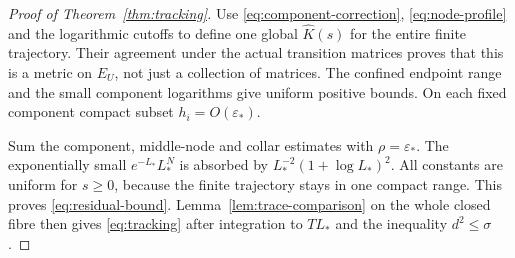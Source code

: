 \begin{proof}[Proof of Theorem~\ref{thm:tracking}]
Use \eqref{eq:component-correction},
\eqref{eq:node-profile} and the logarithmic cutoffs
to define one global $\widehat K(s)$ for the
entire finite trajectory. Their agreement under
the actual transition matrices proves that this
is a metric on $E_U$, not just a collection of
matrices. The confined endpoint range and the
small component logarithms give uniform positive
bounds. On each fixed component compact subset
$h_i=O(\varepsilon_*)$.

Sum the component, middle-node and collar estimates
with $\rho=\varepsilon_*$. The exponentially small
$e^{-L_*}L_*^N$ is absorbed by
$L_*^{-2}(1+\log L_*)^2$. All constants are
uniform for $s\ge0$, because the finite trajectory
stays in one compact range. This proves
\eqref{eq:residual-bound}.
Lemma~\ref{lem:trace-comparison} on the whole
closed fibre then gives \eqref{eq:tracking}
after integration to $TL_*$ and the inequality
$d^2\le\sigma$.
\end{proof}

